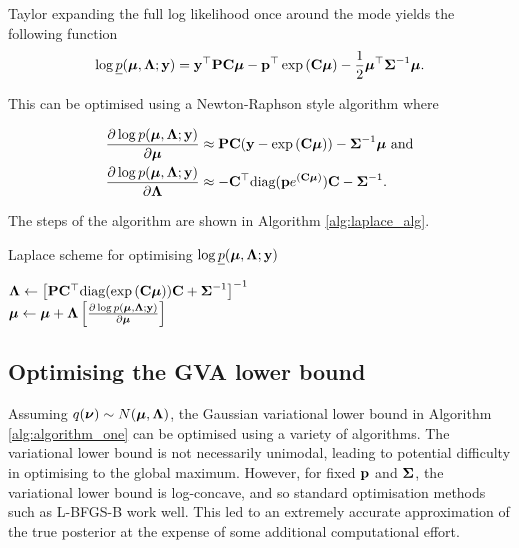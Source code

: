 \documentclass{article}[12pt]
\begin{document}
Taylor expanding the full log likelihood once around the mode yields the following function
\begin{align*}
\log \underline{p}({\boldsymbol \mu}, {\boldsymbol \Lambda}; {\bf y}) = {\bf y}^\top{\bf P}{\bf C}{\boldsymbol\mu} - {\bf p}^\top\exp \left ({\bf C} {\boldsymbol \mu} \right ) - {\frac{1}{2}} {\boldsymbol \mu}^\top {\boldsymbol\Sigma}^{-1} {\boldsymbol \mu}.
\end{align*}

This can be optimised using a Newton-Raphson style algorithm where

\begin{align*}
\frac{\partial \log p({\boldsymbol \mu}, {\boldsymbol \Lambda}; {\bf y})}{\partial {\boldsymbol\mu}} &\approx {\bf P} {\bf C} ({\bf y} - \exp{({\bf C}{\boldsymbol\mu})}) - {\boldsymbol \Sigma}^{-1} {\boldsymbol \mu} \text{ and} \\
\frac{\partial \log p({\boldsymbol \mu}, {\boldsymbol \Lambda}; {\bf y})}{\partial {\boldsymbol\Lambda}} &\approx - {\bf C}^\top \text{diag}({\bf p} e^{({\bf C} {\boldsymbol \mu})}) {\bf C} - {\boldsymbol \Sigma}^{-1}.
\end{align*}

The steps of the algorithm are shown in Algorithm \ref{alg:laplace_alg}.

\begin{algorithm}
\caption{Laplace scheme for optimising $\log \underline{p}({\boldsymbol \mu}, {\boldsymbol \Lambda}; {\bf y})$}
\label{alg:laplace_alg}
\begin{algorithmic}
\STATE ${\boldsymbol \Lambda} \leftarrow \left [{\bf P} {\bf C}^\top \text{diag}(\exp{({\bf C}{\boldsymbol\mu})}) {\bf C} + {\boldsymbol \Sigma}^{-1} \right ]^{-1}$ \\ [1ex] 
\STATE ${\boldsymbol \mu} \leftarrow {\boldsymbol\mu} + {\boldsymbol \Lambda} \left [ \frac{\partial \log p({\boldsymbol \mu}, {\boldsymbol \Lambda}; {\bf y})}{\partial {\boldsymbol\mu}}  \right ]$ \\ [1ex]
\ENDWHILE
\end{algorithmic}
\end{algorithm}

\subsection{Optimising the GVA lower bound}
Assuming $q({\boldsymbol \nu}) \sim N({\boldsymbol \mu}, {\boldsymbol \Lambda})$, the Gaussian variational lower bound in Algorithm
\ref{alg:algorithm_one} can be optimised using a  variety of algorithms. The variational lower bound is not 
necessarily unimodal, leading to potential difficulty in optimising to the global maximum. However, for fixed
${\bf p}$ and ${\boldsymbol \Sigma}$, the variational lower bound is log-concave, and so standard
optimisation methods such as L-BFGS-B work well. This led to an extremely accurate approximation
of the true posterior at the expense of some additional computational effort.
\end{document}
